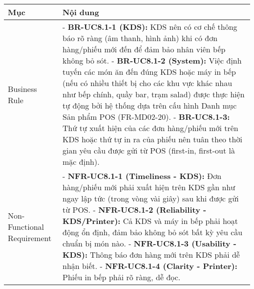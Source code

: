 \begin{longtable}{|m{4cm}|p{11cm}|}
\hline
\textbf{Mục} & \textbf{Nội dung} \\
\hline
Business Rule & - \textbf{BR-UC8.1-1 (KDS):} KDS nên có cơ chế thông báo rõ ràng (âm thanh, hình ảnh) khi có đơn hàng/phiếu mới đến để đảm bảo nhân viên bếp không bỏ sót. \newline - \textbf{BR-UC8.1-2 (System):} Việc định tuyến các món ăn đến đúng KDS hoặc máy in bếp (nếu có nhiều thiết bị cho các khu vực khác nhau như bếp chính, quầy bar, trạm salad) được thực hiện tự động bởi hệ thống dựa trên cấu hình Danh mục Sản phẩm POS (FR-MD02-20). \newline - \textbf{BR-UC8.1-3:} Thứ tự xuất hiện của các đơn hàng/phiếu mới trên KDS hoặc thứ tự in ra của phiếu nên tuân theo thời gian yêu cầu được gửi từ POS (first-in, first-out là mặc định). \\
\hline
Non-Functional Requirement & - \textbf{NFR-UC8.1-1 (Timeliness - KDS):} Đơn hàng/phiếu mới phải xuất hiện trên KDS gần như ngay lập tức (trong vòng vài giây) sau khi được gửi từ POS. \newline - \textbf{NFR-UC8.1-2 (Reliability - KDS/Printer):} Cả KDS và máy in bếp phải hoạt động ổn định, đảm bảo không bỏ sót bất kỳ yêu cầu chuẩn bị món nào. \newline - \textbf{NFR-UC8.1-3 (Usability - KDS):} Thông báo đơn hàng mới trên KDS phải dễ nhận biết. \newline - \textbf{NFR-UC8.1-4 (Clarity - Printer):} Phiếu in bếp phải rõ ràng, dễ đọc. \\
\hline
\end{longtable}

